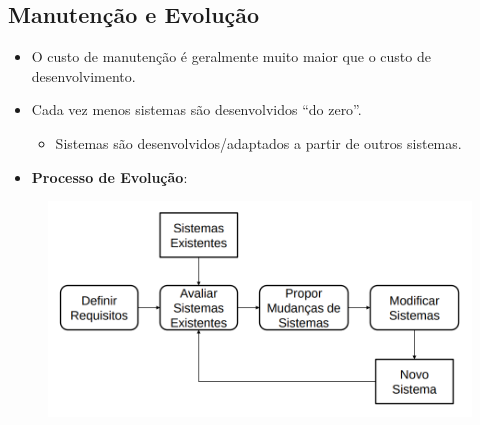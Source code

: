 \documentclass[a4paper, 11pt]{article}
\begin{document}
\subsection{Manutenção e Evolução}
\begin{itemize}
	\item O custo de manutenção é geralmente muito maior que o custo de desenvolvimento.
	\item Cada vez menos sistemas são desenvolvidos “do zero”.
	\begin{itemize}
		\item Sistemas são desenvolvidos/adaptados a partir de outros sistemas.
	\end{itemize}
	\item \textbf{Processo de Evolução}:
\end{itemize}

\begin{figure}[h]
	\includegraphics[width=12.5cm]{modelo_evolucao_software}
	\centering
\end{figure}
\end{document}
